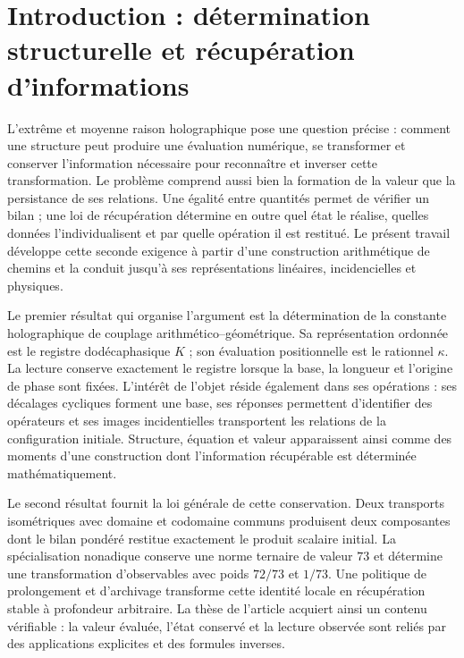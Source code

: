 \section*{Introduction : détermination structurelle et récupération d’informations
}
\label{libro:prologo}
L’extrême et moyenne raison holographique pose une question précise : comment une structure peut produire une évaluation numérique, se transformer et conserver l’information nécessaire pour reconnaître et inverser cette transformation. Le problème comprend aussi bien la formation de la valeur que la persistance de ses relations. Une égalité entre quantités permet de vérifier un bilan ; une loi de récupération détermine en outre quel état le réalise, quelles données l’individualisent et par quelle opération il est restitué. Le présent travail développe cette seconde exigence à partir d’une construction arithmétique de chemins et la conduit jusqu’à ses représentations linéaires, incidencielles et physiques.

Le premier résultat qui organise l’argument est la détermination de la constante holographique de couplage arithmético--géométrique. Sa représentation ordonnée est le registre dodécaphasique \(K\) ; son évaluation positionnelle est le rationnel \(\kappa\). La lecture conserve exactement le registre lorsque la base, la longueur et l’origine de phase sont fixées. L’intérêt de l’objet réside également dans ses opérations : ses décalages cycliques forment une base, ses réponses permettent d’identifier des opérateurs et ses images incidentielles transportent les relations de la configuration initiale. Structure, équation et valeur apparaissent ainsi comme des moments d’une construction dont l’information récupérable est déterminée mathématiquement.


Le second résultat fournit la loi générale de cette conservation. Deux transports isométriques avec domaine et codomaine communs produisent deux composantes dont le bilan pondéré restitue exactement le produit scalaire initial. La spécialisation nonadique conserve une norme ternaire de valeur \(73\) et détermine une transformation d'observables avec poids \(72/73\) et \(1/73\). Une politique de prolongement et d'archivage transforme cette identité locale en récupération stable à profondeur arbitraire. La thèse de l'article acquiert ainsi un contenu vérifiable : la valeur évaluée, l'état conservé et la lecture observée sont reliés par des applications explicites et des formules inverses.


